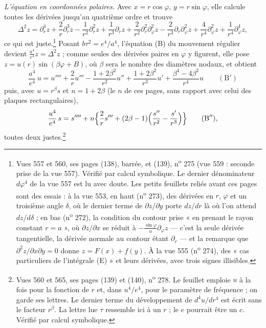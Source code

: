 \documentclass[11pt,a4paper]{article}
\begin{document}
\emph{L'équation en coordonnées polaires.} Avec $x = r\cos\varphi$,
$y = r\sin\varphi$, elle calcule toutes les dérivées jusqu'au quatrième ordre
et trouve
\[
\Delta^2 z = \partial_r^4 z + \frac{2}{r}\partial_r^3 z - \frac{1}{r^2}\partial_r^2 z
+ \frac{1}{r^3}\partial_r z + \frac{2}{r^2}\partial_r^2\partial_\varphi^2 z
- \frac{2}{r^3}\partial_r\partial_\varphi^2 z + \frac{4}{r^4}\partial_\varphi^2 z
+ \frac{1}{r^4}\partial_\varphi^4 z,
\]
ce qui est juste.\footnote{Vues 557 et 560, ses pages (138), barrée, et (139),
n\textsuperscript{o} 275 (vue 559 : seconde prise de la vue 557). Vérifié par
calcul symbolique. Le dernier dénominateur $d\varphi^4$ de la vue 557 est lu
avec doute. Les petits feuillets reliés avant ces pages sont des essais : à la
vue 553, en haut (n\textsuperscript{o} 273), des dérivées en $r$, $\varphi$ et
un troisième angle $\delta$, où le dernier terme de $\partial z/\partial y$ porte
$dz/dr$ là où l'on attend $dz/d\delta$ ; en bas (n\textsuperscript{o} 272), la
condition du contour prise « en prenant le rayon constant $r = a$ », où
$\partial z/\partial x$ se réduit à $-\frac{\sin\varphi}{a}\partial_\varphi z$ —
c'est la seule dérivée tangentielle, la dérivée normale au contour étant
$\partial_r$ — et la remarque que $\partial^2 z/\partial x\partial y = 0$ donne
$z = F(x)+f(y)$. À la vue 555 (n\textsuperscript{o} 274), des « cas
particuliers de l'intégrale (E) » et leurs dérivées, avec trois signes
illisibles.} Posant $b\tau^2 = e^4/a^4$, l'équation (B) du mouvement régulier
devient $\frac{a^4}{e^4}z = \Delta^2 z$ ; comme seules des dérivées paires en
$\varphi$ y figurent, elle pose $z = u(r)\sin(\beta\varphi + B)$, où $\beta$ sera
le nombre des diamètres nodaux, et obtient
\[
\frac{a^4}{e^4}\,u = u'''' + \frac{2}{r}u''' - \frac{1+2\beta^2}{r^2}u''
+ \frac{1+2\beta^2}{r^3}u' + \frac{\beta^4-4\beta^2}{r^4}u \qquad (\text{B}')
\]
puis, avec $u = r^\beta s$ et $n = 1+2\beta$ (le $n$ de ces pages, sans rapport
avec celui des plaques rectangulaires),
\[
\frac{u^4}{e^4}\,s = s'''' + n\Bigl\{\frac{2}{r}s''' + (2\beta-1)\Bigl(\frac{s''}{r^2} - \frac{s'}{r^3}\Bigr)\Bigr\}
\qquad (\text{B}''),
\]
toutes deux justes.\footnote{Vues 560 et 565, ses pages (139) et (140),
n\textsuperscript{o} 278. Le feuillet emploie $u$ à la fois pour la fonction de
$r$ et, dans $u^4/e^4$, pour le paramètre de fréquence ; on garde ses lettres.
Le dernier terme du développement de $d^4u/dr^4$ est écrit sans le facteur
$r^\beta$. La lettre lue $\tau$ ressemble ici à un $r$ ; le $e$ pourrait être un
$c$. Vérifié par calcul symbolique.}
\end{document}
